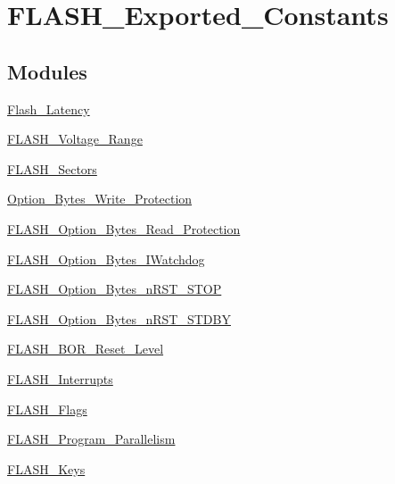 \hypertarget{group___f_l_a_s_h___exported___constants}{}\section{F\+L\+A\+S\+H\+\_\+\+Exported\+\_\+\+Constants}
\label{group___f_l_a_s_h___exported___constants}
\subsection*{Modules}
\begin{DoxyCompactItemize}
\item 
\hyperlink{group___flash___latency}{Flash\+\_\+\+Latency}
\item 
\hyperlink{group___f_l_a_s_h___voltage___range}{F\+L\+A\+S\+H\+\_\+\+Voltage\+\_\+\+Range}
\item 
\hyperlink{group___f_l_a_s_h___sectors}{F\+L\+A\+S\+H\+\_\+\+Sectors}
\item 
\hyperlink{group___option___bytes___write___protection}{Option\+\_\+\+Bytes\+\_\+\+Write\+\_\+\+Protection}
\item 
\hyperlink{group___f_l_a_s_h___option___bytes___read___protection}{F\+L\+A\+S\+H\+\_\+\+Option\+\_\+\+Bytes\+\_\+\+Read\+\_\+\+Protection}
\item 
\hyperlink{group___f_l_a_s_h___option___bytes___i_watchdog}{F\+L\+A\+S\+H\+\_\+\+Option\+\_\+\+Bytes\+\_\+\+I\+Watchdog}
\item 
\hyperlink{group___f_l_a_s_h___option___bytes__n_r_s_t___s_t_o_p}{F\+L\+A\+S\+H\+\_\+\+Option\+\_\+\+Bytes\+\_\+n\+R\+S\+T\+\_\+\+S\+T\+O\+P}
\item 
\hyperlink{group___f_l_a_s_h___option___bytes__n_r_s_t___s_t_d_b_y}{F\+L\+A\+S\+H\+\_\+\+Option\+\_\+\+Bytes\+\_\+n\+R\+S\+T\+\_\+\+S\+T\+D\+B\+Y}
\item 
\hyperlink{group___f_l_a_s_h___b_o_r___reset___level}{F\+L\+A\+S\+H\+\_\+\+B\+O\+R\+\_\+\+Reset\+\_\+\+Level}
\item 
\hyperlink{group___f_l_a_s_h___interrupts}{F\+L\+A\+S\+H\+\_\+\+Interrupts}
\item 
\hyperlink{group___f_l_a_s_h___flags}{F\+L\+A\+S\+H\+\_\+\+Flags}
\item 
\hyperlink{group___f_l_a_s_h___program___parallelism}{F\+L\+A\+S\+H\+\_\+\+Program\+\_\+\+Parallelism}
\item 
\hyperlink{group___f_l_a_s_h___keys}{F\+L\+A\+S\+H\+\_\+\+Keys}
\end{DoxyCompactItemize}
